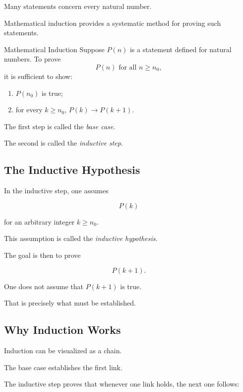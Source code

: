 Many statements concern every natural number.

Mathematical induction provides a systematic method for proving such
statements.

\begin{definitionbox}{Mathematical Induction}
Suppose \(P(n)\) is a statement defined for natural numbers. To prove
\[ P(n)\text{ for all }n\geq n_0, \]
it is sufficient to show:
\begin{enumerate}
    \item \(P(n_0)\) is true;
    \item for every \(k\geq n_0\), \(P(k)\to P(k+1)\).
\end{enumerate}
\end{definitionbox}

The first step is called the \emph{base case}.

The second is called the \emph{inductive step}.

\subsection{The Inductive Hypothesis}
\label{subsec:inductive-hypothesis}

In the inductive step, one assumes

\[ P(k) \]

for an arbitrary integer \(k\geq n_0\).

This assumption is called the \emph{inductive hypothesis}.

The goal is then to prove

\[ P(k+1). \]

One does not assume that \(P(k+1)\) is true.

That is precisely what must be established.

\subsection{Why Induction Works}
\label{subsec:why-induction-works}

Induction can be visualized as a chain.

The base case establishes the first link.

The inductive step proves that whenever one link holds, the next one follows:

